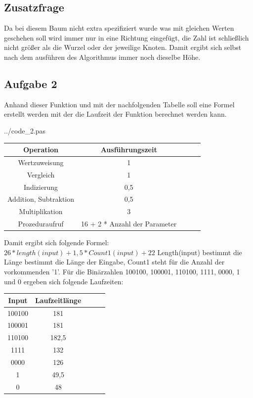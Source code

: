 \subsection*{Zusatzfrage}
Da bei diesem Baum nicht extra spezifiziert wurde was mit gleichen Werten geschehen soll wird immer nur in eine Richtung eingefügt, die Zahl ist schließlich nicht größer als die Wurzel oder der jeweilige Knoten. Damit ergibt sich selbst nach dem ausführen des Algorithmus immer noch dieselbe Höhe.
\newpage


\subsection*{Aufgabe 2}
Anhand dieser Funktion und mit der nachfolgenden Tabelle soll eine Formel erstellt werden mit der die Laufzeit der Funktion berechnet werden kann.\newline

 {../code_2.pas}

\begin{center}
\begin{tabular}{|c|c|c|c|c|}
\hline
Operation               & Ausführungszeit 	\\ \hline 
Wertzuweisung           & 1		            \\ \hline 
Vergleich               & 1 		        \\ \hline 
Indizierung             & 0,5		        \\ \hline 
Addition, Subtraktion 	& 0,5 		        \\ \hline 
Multiplikation 	        & 3 		        \\ \hline 
Prozeduraufruf 	        & 16 + 2 * Anzahl der Parameter		\\ \hline 
\end{tabular}
\end{center}
\raggedright
Damit ergibt sich folgende Formel: $26 * length(input) + 1,5 * Count1(input) + 22 $
\newline
\newline
Length(input) bestimmt die Länge bestimmt die Länge der Eingabe, Count1 steht für die Anzahl der vorkommenden '1'.
\newline
\newline
Für die Binärzahlen 100100, 100001, 110100, 1111, 0000, 1 und 0 ergeben sich folgende Laufzeiten:

\begin{center}
\begin{tabular}{|c|c|c|c|c|}
\hline
Input    & Laufzeitlänge \\ \hline 
100100   & 181 	\\ \hline 
100001   & 181	\\ \hline 
110100   & 182,5 	\\ \hline 
1111     & 132	\\ \hline 
0000	 & 126	\\ \hline 
1 	     & 49,5	\\ \hline 
0 	     & 48	\\ \hline 
\end{tabular}
\end{center}
\raggedright

